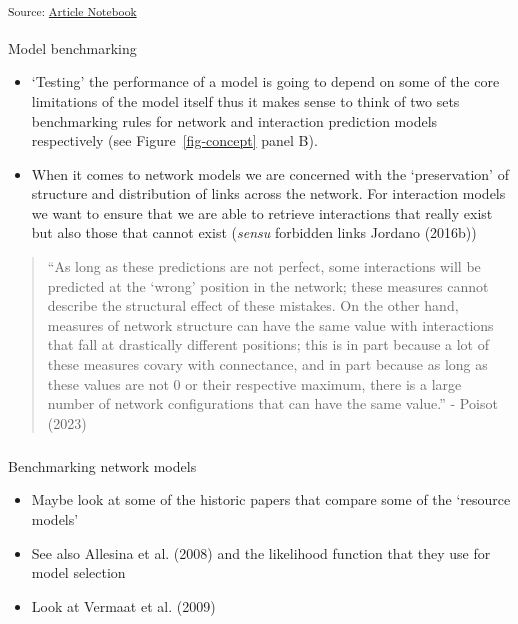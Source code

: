 \documentclass[
]{agujournal2019}
\makeatletter
\let\oldparagraph\paragraph
\renewcommand{\paragraph}{
    \@ifstar
      \xxxParagraphStar
      \xxxParagraphNoStar
  }
\newcommand{\xxxParagraphStar}[1]{\oldparagraph*{#1}\mbox{}}
\newcommand{\xxxParagraphNoStar}[1]{\oldparagraph{#1}\mbox{}}
\let\oldsubparagraph\subparagraph
\renewcommand{\subparagraph}{
    \@ifstar
      \xxxSubParagraphStar
      \xxxSubParagraphNoStar
  }
\newcommand{\xxxSubParagraphStar}[1]{\oldsubparagraph*{#1}\mbox{}}
\newcommand{\xxxSubParagraphNoStar}[1]{\oldsubparagraph{#1}\mbox{}}
\makeatother
\begin{document}
\textsubscript{Source:
\href{https://BecksLab.github.io/ms_t_is_for_topology/index.qmd.html}{Article
Notebook}}

\paragraph{Model benchmarking}\label{model-benchmarking}

\begin{itemize}
\item
  `Testing' the performance of a model is going to depend on some of the
  core limitations of the model itself thus it makes sense to think of
  two sets benchmarking rules for network and interaction prediction
  models respectively (see Figure~\ref{fig-concept} panel B).
\item
  When it comes to network models we are concerned with the
  `preservation' of structure and distribution of links across the
  network. For interaction models we want to ensure that we are able to
  retrieve interactions that really exist but also those that cannot
  exist (\emph{sensu} forbidden links Jordano (2016b))
\end{itemize}

\begin{quote}
``As long as these predictions are not perfect, some interactions will
be predicted at the `wrong' position in the network; these measures
cannot describe the structural effect of these mistakes. On the other
hand, measures of network structure can have the same value with
interactions that fall at drastically different positions; this is in
part because a lot of these measures covary with connectance, and in
part because as long as these values are not 0 or their respective
maximum, there is a large number of network configurations that can have
the same value.'' - Poisot (2023)
\end{quote}

\subparagraph{Benchmarking network
models}\label{benchmarking-network-models}

\begin{itemize}
\item
  Maybe look at some of the historic papers that compare some of the
  `resource models'
\item
  See also Allesina et al. (2008) and the likelihood function that they
  use for model selection
\item
  Look at Vermaat et al. (2009)
\end{itemize}
\end{document}
